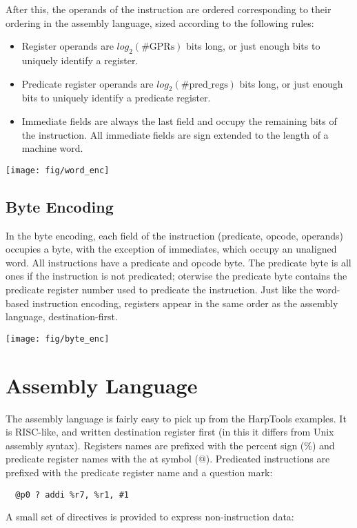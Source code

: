 \documentclass[10pt,letterpaper]{article}
\begin{document}
After this, the operands of the instruction are ordered corresponding to their ordering in the assembly language, sized according to the following rules:
\begin{itemize}
  \item Register operands are $log_2(\mathrm{\#GPRs})$ bits long, or just enough bits to uniquely identify a register.
  \item Predicate register operands are $log_2(\mathrm{\#pred\_regs})$ bits long, or just enough bits to uniquely identify a predicate register.
  \item Immediate fields are always the last field and occupy the remaining bits of the instruction. All immediate fields are sign extended to the length of a machine word.
\end{itemize}

\begin{center}
\texttt{[image: fig/word\_enc]}
\end{center}

\subsection{Byte Encoding}
In the byte encoding, each field of the instruction (predicate, opcode, operands) occupies a byte, with the exception of immediates, which occupy an unaligned word.
All instructions have a predicate and opcode byte.
The predicate byte is all ones if the instruction is not predicated; oterwise the predicate byte contains the predicate register number used to predicate the instruction.
Just like the word-based instruction encoding, registers appear in the same order as the assembly language, destination-first.

\begin{center}
\texttt{[image: fig/byte\_enc]}
\end{center}

\section{Assembly Language}
The assembly language is fairly easy to pick up from the HarpTools examples. It is RISC-like, and written destination register first (in this it differs from Unix assembly syntax).
Registers names are prefixed with the percent sign (\%) and predicate register names with the at symbol (@).
Predicated instructions are prefixed with the predicate register name and a question mark:
\begin{verbatim}
  @p0 ? addi %r7, %r1, #1
\end{verbatim}
A small set of directives is provided to express non-instruction data:
\end{document}
